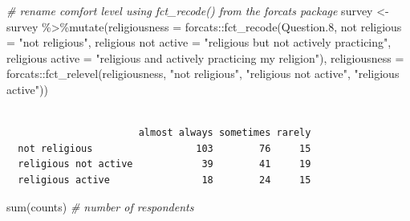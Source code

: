\documentclass[
]{book}
\newenvironment{Shaded}{\begin{snugshade}}{\end{snugshade}}
\newcommand{\AttributeTok}[1]{\textcolor[rgb]{0.77,0.63,0.00}{#1}}
\newcommand{\CommentTok}[1]{\textcolor[rgb]{0.56,0.35,0.01}{\textit{#1}}}
\newcommand{\FloatTok}[1]{\textcolor[rgb]{0.00,0.00,0.81}{#1}}
\newcommand{\FunctionTok}[1]{\textcolor[rgb]{0.00,0.00,0.00}{#1}}
\newcommand{\NormalTok}[1]{#1}
\newcommand{\OtherTok}[1]{\textcolor[rgb]{0.56,0.35,0.01}{#1}}
\newcommand{\SpecialCharTok}[1]{\textcolor[rgb]{0.00,0.00,0.00}{#1}}
\newcommand{\StringTok}[1]{\textcolor[rgb]{0.31,0.60,0.02}{#1}}
\begin{document}
\begin{Shaded}
\begin{Highlighting}[]
\CommentTok{\# rename comfort level using fct\_recode() from the forcats package}
\NormalTok{survey }\OtherTok{\textless{}{-}}\NormalTok{ survey }\SpecialCharTok{\%\textgreater{}\%}\FunctionTok{mutate}\NormalTok{(}\AttributeTok{religiousness =}\NormalTok{ forcats}\SpecialCharTok{::}\FunctionTok{fct\_recode}\NormalTok{(Question}\FloatTok{.8}\NormalTok{, }
                          \StringTok{\textasciigrave{}}\AttributeTok{not religious}\StringTok{\textasciigrave{}} \OtherTok{=} \StringTok{"not religious"}\NormalTok{,}
                          \StringTok{\textasciigrave{}}\AttributeTok{religious not active}\StringTok{\textasciigrave{}} \OtherTok{=} \StringTok{"religious but not actively practicing"}\NormalTok{,}
                          \StringTok{\textasciigrave{}}\AttributeTok{religious active}\StringTok{\textasciigrave{}} \OtherTok{=} \StringTok{"religious and actively practicing my religion"}\NormalTok{),}
                          \AttributeTok{religiousness =}\NormalTok{ forcats}\SpecialCharTok{::}\FunctionTok{fct\_relevel}\NormalTok{(religiousness,}
                                                               \StringTok{"not religious"}\NormalTok{,}
                                                               \StringTok{"religious not active"}\NormalTok{,}
                                                               \StringTok{"religious active"}\NormalTok{))}
\end{Highlighting}
\end{Shaded}

\begin{Shaded}
\end{Shaded}

\begin{verbatim}
                      
                       almost always sometimes rarely
  not religious                  103        76     15
  religious not active            39        41     19
  religious active                18        24     15
\end{verbatim}

\begin{Shaded}
\begin{Highlighting}[]
\FunctionTok{sum}\NormalTok{(counts)  }\CommentTok{\# number of respondents}
\end{Highlighting}
\end{Shaded}
\end{document}

